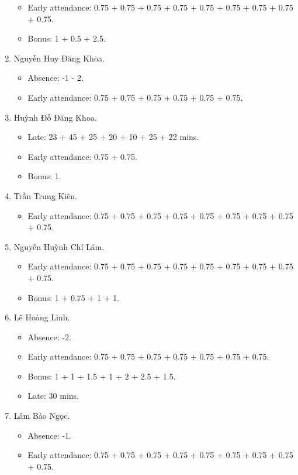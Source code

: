 \documentclass{article}
\begin{document}
\begin{enumerate}
	\begin{itemize}
		\item Early attendance: 0.75 + 0.75 + 0.75 + 0.75 + 0.75 + 0.75 + 0.75 + 0.75 + 0.75.
		\item Bonus: 1 + 0.5 + 2.5.
	\end{itemize}
	\item {\sc Nguyễn Huy Đăng Khoa.}
	\begin{itemize}
		\item Absence: -1 - 2.
		\item Early attendance: 0.75 + 0.75 + 0.75 + 0.75 + 0.75 + 0.75.
	\end{itemize}
	\item {\sc Huỳnh Đỗ Đăng Khoa.}
	\begin{itemize}
		\item Late: 23 + 45 + 25 + 20 + 10 + 25 + 22 mins.
		\item Early attendance: 0.75 + 0.75.
        \item Bonus: 1.
	\end{itemize}
	\item {\sc Trần Trung Kiên.}
	\begin{itemize}
		\item Early attendance: 0.75 + 0.75 + 0.75 + 0.75 + 0.75 + 0.75 + 0.75 + 0.75 + 0.75.
	\end{itemize}
	\item {\sc Nguyễn Huỳnh Chí Lâm.}
	\begin{itemize}
		\item Early attendance: 0.75 + 0.75 + 0.75 + 0.75 + 0.75 + 0.75 + 0.75 + 0.75 + 0.75.
		\item Bonus: 1 + 0.75 + 1 + 1.
	\end{itemize}
	\item {\sc Lê Hoàng Linh.}
	\begin{itemize}
        \item Absence: -2.
		\item Early attendance: 0.75 + 0.75 + 0.75 + 0.75 + 0.75 + 0.75 + 0.75.
		\item Bonus: 1 + 1 + 1.5 + 1 + 2 + 2.5 + 1.5.
		\item Late: 30 mins.
	\end{itemize}
	\item {\sc Lâm Bảo Ngọc.}
	\begin{itemize}
		\item Absence: -1.
		\item Early attendance: 0.75 + 0.75 + 0.75 + 0.75 + 0.75 + 0.75 + 0.75 + 0.75 + 0.75.

\end{itemize}
\end{enumerate}
\end{document}
